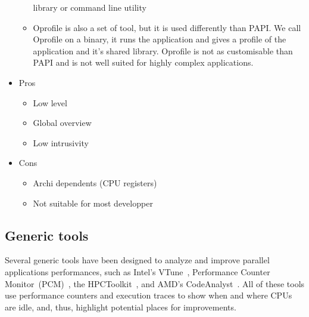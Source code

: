 \begin{itemize}
\begin{itemize}
                library or command line utility
            \item Oprofile \cite{Oprofile} is also a set of tool, but it is used
                differently than PAPI. We call Oprofile on a binary, it runs the
                application and gives a profile of the application and it's shared
                library. Oprofile is not as customisable than PAPI and is not well
                suited for highly complex applications.
        \end{itemize}
    \item Pros
        \begin{itemize}
            \item Low level
            \item Global overview
            \item Low intrusivity
        \end{itemize}
    \item Cons
        \begin{itemize}
            \item Archi dependents (CPU registers)
            \item Not suitable for most developper
        \end{itemize}
\end{itemize}

\subsection{Generic tools}

Several generic tools have been designed to analyze and improve parallel
applications performances, such as Intel's VTune~\cite{Reinders05VTune},
Performance Counter Monitor~(PCM)~\cite{Intel2012b}, the
HPCToolkit~\cite{Adhianto10HPCTOOLKIT}, and AMD's
CodeAnalyst~\cite{Drongowski2008}. All of these tools use performance
counters and execution traces to show when and where CPUs are idle, and, thus,
highlight potential places for improvements.


